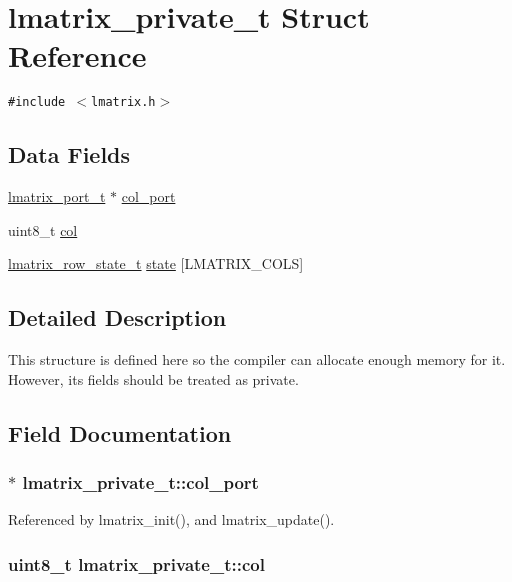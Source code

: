 \hypertarget{structlmatrix__private__t}{
\section{lmatrix\_\-private\_\-t Struct Reference}
\label{structlmatrix__private__t}
}
{\tt \#include $<$lmatrix.h$>$}

\subsection*{Data Fields}
\begin{CompactItemize}
\item 
\hyperlink{structlmatrix__port__t}{lmatrix\_\-port\_\-t} $\ast$ \hyperlink{structlmatrix__private__t_a80b9c384f05bbddb47eb6857f96ab2b}{col\_\-port}
\item 
uint8\_\-t \hyperlink{structlmatrix__private__t_4c939614158738c66bc01c9e82829280}{col}
\item 
\hyperlink{lmatrix_8h_af6a0fe2df788e17c8084c26579b4e7a}{lmatrix\_\-row\_\-state\_\-t} \hyperlink{structlmatrix__private__t_3c1b8785b58a346d07088c4dffa49be6}{state} \mbox{[}LMATRIX\_\-COLS\mbox{]}
\end{CompactItemize}


\subsection{Detailed Description}
This structure is defined here so the compiler can allocate enough memory for it. However, its fields should be treated as private. 

\subsection{Field Documentation}
\hypertarget{structlmatrix__private__t_a80b9c384f05bbddb47eb6857f96ab2b}{
\subsubsection{$\ast$ {\bf lmatrix\_\-private\_\-t::col\_\-port}}}
\label{structlmatrix__private__t_a80b9c384f05bbddb47eb6857f96ab2b}




Referenced by lmatrix\_\-init(), and lmatrix\_\-update().\hypertarget{structlmatrix__private__t_4c939614158738c66bc01c9e82829280}{
\subsubsection{\setlength{\rightskip}{0pt plus 5cm}uint8\_\-t {\bf lmatrix\_\-private\_\-t::col}}}
\label{structlmatrix__private__t_4c939614158738c66bc01c9e82829280}




